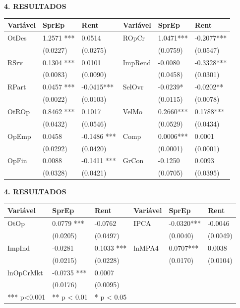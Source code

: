 \documentclass[
  ignorenonframetext,
  aspectratio=169,
  ignorenonframetext]{beamer}
\begin{document}
\begin{frame}{\textbf{4. RESULTADOS}}
\protect\hypertarget{resultados-3}{}
\begin{longtable}[]{@{}llllll@{}}
\toprule
Variável & SprEp & Rent & Variável & SprEp & Rent \\
\midrule
\endhead
OtDes & 1.2571 *** & 0.0514 & ROpCr & 1.0471*** & -0.2077*** \\
& (0.0227) & (0.0275) & & (0.0759) & (0.0547) \\
RSrv & 0.1304 *** & 0.0101 & ImpRend & -0.0080 & -0.3328*** \\
& (0.0083) & (0.0090) & & (0.0458) & (0.0301) \\
RPart & 0.0457 *** & -0.0415*** & SelOvr & -0.0239* & -0.0202** \\
& (0.0022) & (0.0103) & & (0.0115) & (0.0078) \\
OtROp & 0.8462 *** & 0.1017 & VelMo & 0.2660*** & 0.1788*** \\
& (0.0432) & (0.0546) & & (0.0529) & (0.0434) \\
OpEmp & 0.0458 & -0.1486 *** & Comp & 0.0006*** & 0.0001 \\
& (0.0292) & (0.0420) & & (0.0001) & (0.0001) \\
OpFin & 0.0088 & -0.1411 *** & GrCon & -0.1250 & 0.0093 \\
& (0.0328) & (0.0421) & & (0.0705) & (0.0395) \\
\bottomrule
\end{longtable}
\end{frame}

\begin{frame}{\textbf{4. RESULTADOS}}
\protect\hypertarget{resultados-4}{}
\begin{longtable}[]{@{}llllll@{}}
\toprule
Variável & SprEp & Rent & Variável & SprEp & Rent \\
\midrule
\endhead
OtOp & 0.0779 *** & -0.0762 & IPCA & -0.0320*** & -0.0046 \\
& (0.0205) & (0.0497) & & (0.0040) & (0.0049) \\
ImpInd & -0.0281 & 0.1033 *** & lnMPA4 & 0.0707*** & 0.0038 \\
& (0.0215) & (0.0228) & & (0.0170) & (0.0104) \\
lnOpCrMkt & -0.0735 *** & 0.0007 & & & \\
& (0.0176) & (0.0095) & & & \\
*** p\textless0.001 & ** p \textless{} 0.01 & * p \textless{} 0.05 & &
& \\
\bottomrule
\end{longtable}
\end{frame}
\end{document}
